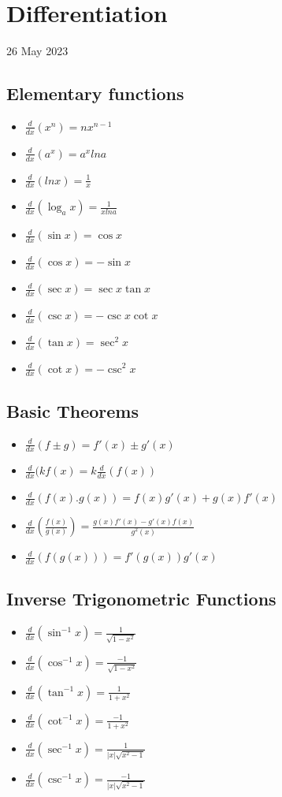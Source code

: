 \documentclass[12pt]{article}
\begin{document}
\section{Differentiation}
26 May 2023
\subsection{Elementary functions}
\begin{itemize}
\item $\frac{d}{dx} (x^n)=nx^{n-1}$
\item $\frac{d}{dx} (a^x)=a^x lna$
\item $\frac{d}{dx} (lnx)=\frac{1}{x}$
\item $\frac{d}{dx} (\log_a x)=\frac{1}{xlna}$
\item $\frac{d}{dx} (\sin x)=\cos x$
\item $\frac{d}{dx} (\cos x)=-\sin x$
\item $\frac{d}{dx} (\sec x)=\sec x \tan x$
\item $\frac{d}{dx} (\csc x)=-\csc x \cot x$
\item $\frac{d}{dx} (\tan x)=\sec^2x$
\item $\frac{d}{dx} (\cot x)=-\csc^2x$
\end{itemize}
\subsection{Basic Theorems}
\begin{itemize}
\item $\frac{d}{dx} (f \pm g)=f'(x) \pm g'(x)$
\item $\frac{d}{dx} (kf(x)=k\frac{d}{dx}(f(x))$
\item $\frac{d}{dx} (f(x).g(x))=f(x)g'(x)+g(x)f'(x)$
\item $\frac{d}{dx} (\frac{f(x)}{g(x)})=\frac{g(x)f'(x)-g'(x)f(x)}{g^2(x)}$
\item $\frac{d}{dx} (f(g(x)))=f'(g(x))g'(x)$
\end{itemize}
\subsection{Inverse Trigonometric Functions}
\begin{itemize}
\item $\frac{d}{dx} (\sin^{-1}x)=\frac{1}{\sqrt{1-x^2}}$
\item $\frac{d}{dx} (\cos^{-1}x)=\frac{-1}{\sqrt{1-x^2}}$
\item $\frac{d}{dx} (\tan^{-1}x)=\frac{1}{1+x^2}$
\item $\frac{d}{dx} (\cot^{-1}x)=\frac{-1}{1+x^2}$
\item $\frac{d}{dx} (\sec^{-1}x)=\frac{1}{|x| \sqrt{x^2-1}}$
\item $\frac{d}{dx} (\csc^{-1}x)=\frac{-1}{|x| \sqrt{x^2-1}}$
\end{itemize}
\end{document}
